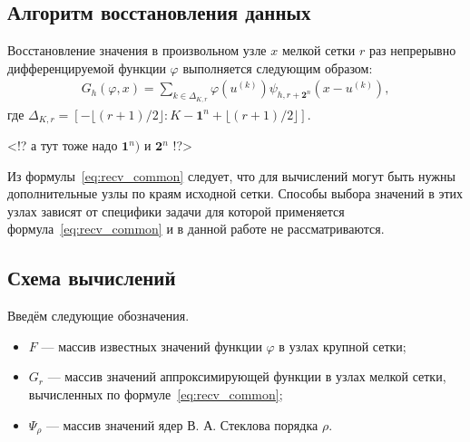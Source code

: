 
\label{sec:func_recv}

\subsection*{Алгоритм восстановления данных}

Восстановление значения в произвольном  узле $x$    мелкой сетки %
$r$ раз непрерывно дифференцируемой функции $\varphi$
выполняется следующим образом: 
\begin{gather}
  \label{eq:recv_common}
  G_h(\varphi, x) = \sum_{k\in  \Delta_{K,r}}
   \varphi(u^{(k)})
   \psi_{h, r+\mathbf{2}^n}(x-u^{(k)}),%
 \end{gather}
 где $ \Delta_{K,r}=\left[-\lfloor{(r+1)/2}\rfloor:
   K-\mathbf{1}^n+\lfloor{(r+1)/2}\rfloor\right]$.  %

 <!? а тут тоже надо $\mathbf{1}^n)$ и  $\mathbf{2}^n$ !?>

Из формулы~\eqref{eq:recv_common} следует, что для вычислений
могут быть нужны дополнительные
узлы по краям исходной сетки.
Способы выбора значений в этих узлах зависят
от специфики задачи для которой применяется формула~\eqref{eq:recv_common}  
и в данной работе не рассматриваются.


\subsection*{Схема вычислений}


Введём  следующие обозначения.
\begin{itemize}

\item
  $F$  --- массив  известных значений функции $\varphi$
  в узлах крупной сетки;

\item
  $G_r$ --- массив
  значений аппроксимирующей функции в узлах мелкой сетки,
  вычисленных по формуле~\eqref{eq:recv_common};

\item
  $\Psi_{\rho}$ --- массив  значений ядер В. А. Стеклова порядка $\rho$.

\end{itemize}


